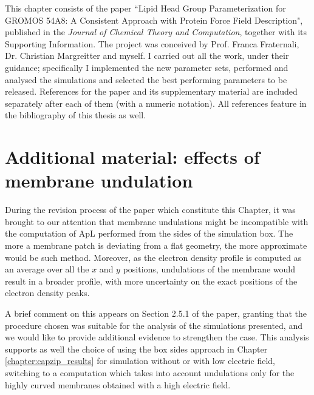 This chapter consists of the paper ``Lipid Head Group Parameterization for GROMOS 54A8: A Consistent Approach with Protein Force Field Description", published in the \emph{Journal of Chemical Theory and Computation}, together with its Supporting Information. The project was conceived by Prof. Franca Fraternali, Dr. Christian Margreitter and myself. I carried out all the work, under their guidance; specifically I implemented the new parameter sets, performed and analysed the simulations and selected the best performing parameters to be released. References for the paper and its supplementary material are included separately after each of them (with a numeric notation). All references feature in the bibliography of this thesis as well.










\section{Additional material: effects of membrane undulation}

During the revision process of the paper which constitute this Chapter, it was brought to our attention that membrane undulations might be incompatible with the computation of ApL performed from the sides of the simulation box. The more a membrane patch is deviating from a flat geometry, the more approximate would be such method.
%
Moreover, as the electron density profile is computed as an average over all the $x$ and $y$ positions, undulations of the membrane would result in a broader profile, with more uncertainty on the exact positions of the electron density peaks.

A brief comment on this appears on Section 2.5.1 of the paper, granting that the procedure chosen was suitable for the analysis of the simulations presented, and we would like to provide additional evidence to strengthen the case.
%
This analysis supports as well the choice of using the box sides approach in Chapter \ref{chapter:capzip_results} for simulation without or with low electric field, switching to a computation which takes into account undulations only for the highly curved membranes obtained with a high electric field.

